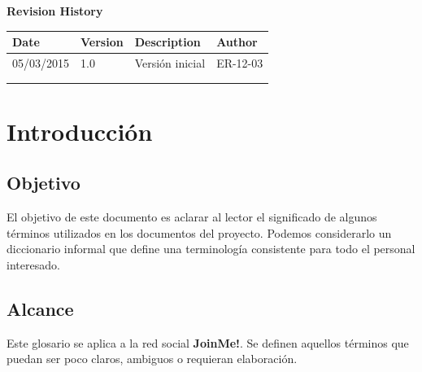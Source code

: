 \documentclass[12pt, a4paper, titlepage]{article}
\begin{document}
\begin{titlepage}
\vspace{2cm}
\begin{center}
	\large{\textbf{Revision History}}
	
    \begin{tabular}{ | p{4cm} | p{2cm} | p{5cm} | p{4cm} |}
    \hline
    \textbf{Date} & \textbf{Version} & \textbf{Description} & \textbf{Author} \\ \hline
    05/03/2015 & 1.0 & Versión inicial & ER-12-03  \\ \hline
    & & & \\ \hline
    & & & \\ \hline
    \end{tabular}
\end{center}

\end{titlepage}
\clearpage


\tableofcontents
\clearpage

\section{Introducción}

\subsection{Objetivo}

El objetivo de este documento es aclarar al lector el significado de algunos términos utilizados en los documentos del proyecto. Podemos considerarlo un diccionario informal que define una terminología consistente para todo el personal interesado.

\subsection{Alcance}

Este glosario se aplica a la red social \textbf{JoinMe!}. Se definen aquellos términos que puedan ser poco claros, ambiguos o requieran elaboración.
\end{document}
